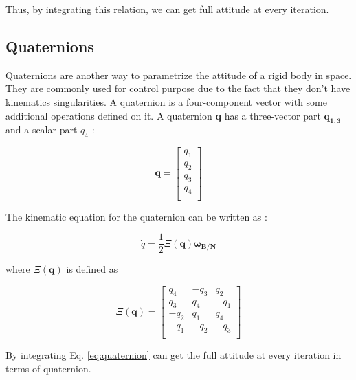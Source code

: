 Thus, by integrating this relation, we can get full attitude at every iteration.

\subsection{Quaternions}
Quaternions are another way to parametrize the attitude of a rigid body in space. They are commonly used for control purpose due to the fact that they don't have kinematics singularities.
A quaternion is a four-component vector with some additional operations defined on it. A quaternion $\mathbf{q}$ has a three-vector part $\mathbf{q_{1:3}}$ and a scalar part $q_{4}$ : 

\begin{equation*}
 \mathbf{q} =
                                \begin{bmatrix}
                                    q_{1}\\
                                    q_{2}\\
                                    q_{3}\\
                                    q_{4}\\
                                \end{bmatrix}
\end{equation*}

The kinematic equation for the quaternion can be written as :

\begin{equation}
 \label{eq:quaternion}
 \dot{q} = \frac{1}{2} \mathbf{\varXi(\mathbf{q})} \mathbf{\omega_{B/N}}
\end{equation}

where $\mathbf{\varXi(\mathbf{q})}$ is defined as 

\begin{equation*}
 \mathbf{\varXi(\mathbf{q})} =
                                \begin{bmatrix}
                                   q_4 & -q_3 & q_2\\
                                   q_3 & q_4 & -q_1\\
                                  -q_2 & q_1 & q_4\\
                                  -q_1 & -q_2 & -q_3\\
                                \end{bmatrix}
\end{equation*}

By integrating Eq. \ref{eq:quaternion} can get the full attitude at every iteration in terms of quaternion.

